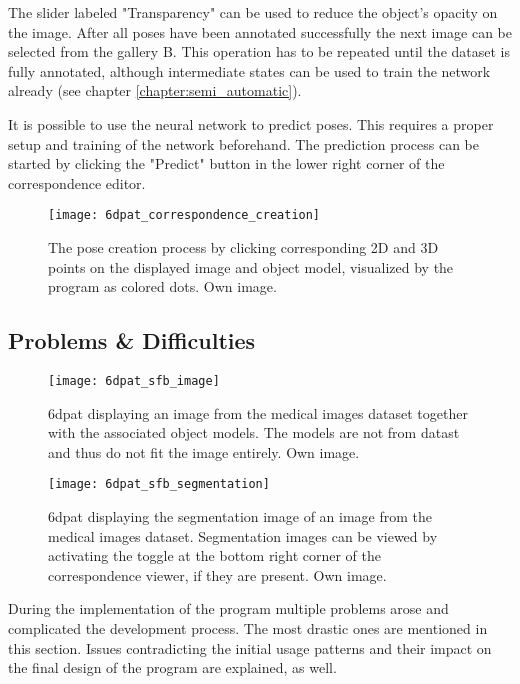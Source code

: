 The slider labeled "Transparency" can be used to reduce the object's opacity on the image. After all poses have been annotated successfully the next image can be selected from the gallery B. This operation has to be repeated until the dataset is fully annotated, although intermediate states can be used to train the network already (see chapter \ref{chapter:semi_automatic}).

It is possible to use the neural network to predict poses. This requires a proper setup and training of the network beforehand. The prediction process can be started by clicking the "Predict" button in the lower right corner of the correspondence editor.

\begin{figure}[!tbp]
	\centering
    \texttt{[image: 6dpat\_correspondence\_creation]}
    \caption{The pose creation process by clicking corresponding 2D and 3D points on the displayed image and object model, visualized by the program as colored dots. Own image.}
    \label{fig:6dpat_correspondence_creation}
\end{figure} 

\subsection{Problems \& Difficulties} \label{section:6dpat_difficulties}

\begin{figure}[!tbp]
	\centering
    \texttt{[image: 6dpat\_sfb\_image]}
    \caption{\gls{6dpat} displaying an image from the medical images dataset together with the associated object models. The models are not from datast and thus do not fit the image entirely. Own image.}
    \label{fig:6dpat_sfb_image}
\end{figure} 

\begin{figure}[!tbp]
	\centering
    \texttt{[image: 6dpat\_sfb\_segmentation]}
    \caption{\gls{6dpat} displaying the segmentation image of an image from the medical images dataset. Segmentation images can be viewed by activating the toggle at the bottom right corner of the correspondence viewer, if they are present. Own image.}
    \label{fig:6dpat_sfb_segmentation}
\end{figure} 

During the implementation of the program multiple problems arose and complicated the development process. The most drastic ones are mentioned in this section. Issues contradicting the initial usage patterns and their impact on the final design of the program are explained, as well. \\

